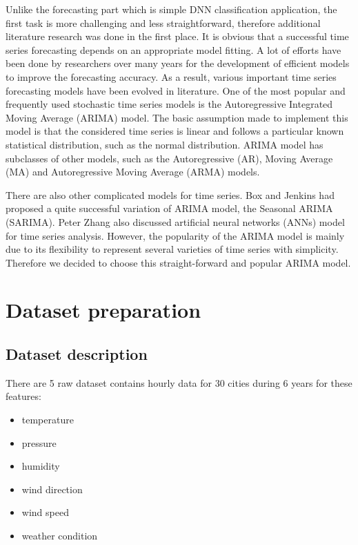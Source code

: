 \documentclass[runningheads]{llncs}
\begin{document}
Unlike the forecasting part which is simple DNN classification application, the first task is more challenging and less straightforward, therefore additional literature research was done in the first place. It is obvious that a successful time series forecasting depends on an appropriate model fitting. A lot of efforts have been done by researchers over many years for the development of efficient models to improve the forecasting accuracy. As a result, various important time series forecasting models have been evolved in literature. One of the most popular and frequently used stochastic time series models is the Autoregressive Integrated Moving Average (ARIMA) model. The basic assumption made to implement this model is that the considered time series is linear and follows a particular known statistical distribution, such as the normal distribution. ARIMA model has subclasses of other models, such as the Autoregressive (AR), Moving Average (MA) and Autoregressive Moving Average (ARMA) models. \cite{arxivadhi}

There are also other complicated models for time series. Box and Jenkins\cite{boxcali} had proposed a quite successful variation of ARIMA model, the Seasonal ARIMA (SARIMA). Peter Zhang \cite{zhangneur} also discussed artificial neural networks (ANNs) model for time series analysis. However, the popularity of the ARIMA model is mainly due to its flexibility to represent several varieties of time series with simplicity. Therefore we decided to choose this straight-forward and popular ARIMA model.


\section{Dataset preparation}
\subsection{Dataset description}
There are 5 raw dataset contains hourly data for 30 cities during 6 years for these features:
\begin{itemize}
	\item temperature
	\item pressure
	\item humidity
    \item wind direction 
    \item wind speed
	\item weather condition
\end{itemize}
\end{document}
